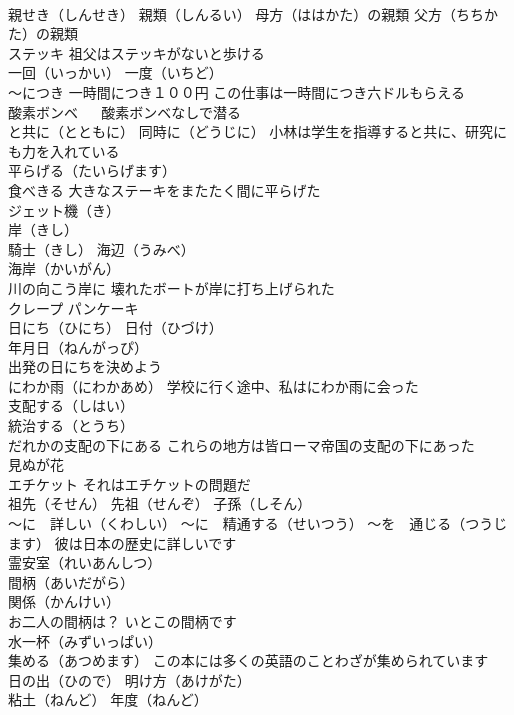 \documentclass[8pt]{extreport}
\begin{document}
\begin{CJK}{UTF8}{min}
\\	親せき（しんせき） 親類（しんるい） 母方（ははかた）の親類 父方（ちちかた）の親類
\\	ステッキ 祖父はステッキがないと歩ける
\\	一回（いっかい） 一度（いちど）
\\	～につき 一時間につき１００円 この仕事は一時間につき六ドルもらえる
\\	酸素ボンベ 　 酸素ボンベなしで潜る
\\	と共に（とともに） 同時に（どうじに） 小林は学生を指導すると共に、研究にも力を入れている
\\	平らげる（たいらげます）
\\	食べきる 大きなステーキをまたたく間に平らげた
\\	ジェット機（き）
\\	岸（きし）　　
\\	騎士（きし） 海辺（うみべ）
\\	海岸（かいがん）
\\	川の向こう岸に 壊れたボートが岸に打ち上げられた
\\	クレープ パンケーキ
\\	日にち（ひにち） 日付（ひづけ）
\\	年月日（ねんがっぴ）
\\	出発の日にちを決めよう
\\	にわか雨（にわかあめ） 学校に行く途中、私はにわか雨に会った
\\	支配する（しはい） 
\\	統治する（とうち）
\\	だれかの支配の下にある これらの地方は皆ローマ帝国の支配の下にあった
\\	見ぬが花 
\\	エチケット それはエチケットの問題だ
\\	祖先（そせん） 先祖（せんぞ） 子孫（しそん）
\\	～に　詳しい（くわしい） ～に　精通する（せいつう） ～を　通じる（つうじます） 彼は日本の歴史に詳しいです
\\	霊安室（れいあんしつ）
\\	間柄（あいだがら）
\\	関係（かんけい） 
\\	お二人の間柄は？ いとこの間柄です
\\	水一杯（みずいっぱい）
\\	集める（あつめます） この本には多くの英語のことわざが集められています
\\	日の出（ひので） 明け方（あけがた）
\\	粘土（ねんど） 年度（ねんど）

\end{CJK}
\end{document}
